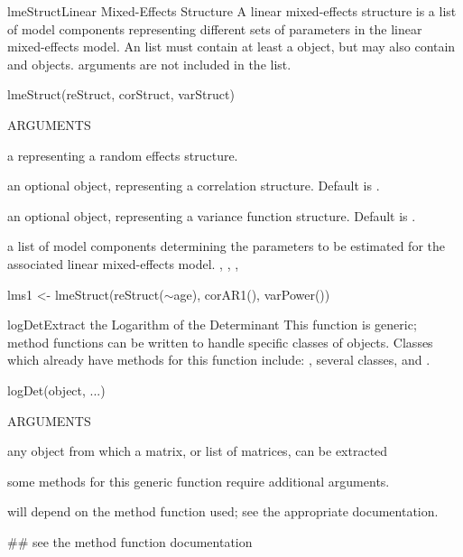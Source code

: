 \documentclass[pdftex]{article} \usepackage{url,graphicx}
\renewcommand{\Twiddle}{\mbox{\(\sim\)}}
\begin{document}
\begin{Helpfile}{lmeStruct}{Linear Mixed-Effects Structure}
A linear mixed-effects structure is a list of model components
representing different sets of parameters in the linear mixed-effects
model. An  list must contain at least a
 object, but may also contain  and
 objects.  arguments are not included in the
 list.
\begin{Example}
lmeStruct(reStruct, corStruct, varStruct)
\end{Example}
\begin{Argument}{ARGUMENTS}
\item[\Co{reStruct:}]
a  representing a random effects
structure.
\item[\Co{corStruct:}]
an optional  object, representing a
correlation structure. Default is .
\item[\Co{varStruct:}]
an optional  object, representing a
variance function structure. Default is .
\end{Argument}
a list of model components determining the parameters to be estimated
for the associated linear mixed-effects model.
, ,
, 
\need 15pt
\vspace{-16pt} 
\begin{Example}
lms1 <- lmeStruct(reStruct(\Twiddle age), corAR1(), varPower())
\end{Example}
\end{Helpfile}
\begin{Helpfile}{logDet}{Extract the Logarithm of the Determinant}
This function is generic; method functions can be written to handle
specific classes of objects. Classes which already have methods for
this function include: , several  classes,
and .
\begin{Example}
logDet(object, ...)
\end{Example}
\begin{Argument}{ARGUMENTS}
\item[\Co{object:}]
any object from which a matrix, or list of matrices, can
be extracted
\item[\Co{...:}]
some methods for this generic function require additional
arguments.
\end{Argument}
will depend on the method function used; see the appropriate
documentation.
\need 15pt
\vspace{-16pt} 
\begin{Example}
## see the method function documentation
\end{Example}
\end{Helpfile}
\end{document}
